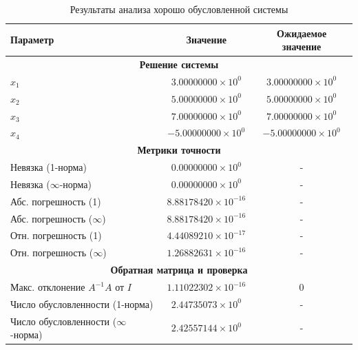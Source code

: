 \documentclass[12pt, a4paper]{article}
\begin{document}
\begin{table}[h]
\centering
\caption{Результаты анализа хорошо обусловленной системы}
\begin{tabular}{|l|c|c|}
\hline
\textbf{Параметр} & \textbf{Значение} & \textbf{Ожидаемое значение} \\
\hline
\multicolumn{3}{|c|}{\textbf{Решение системы}} \\
\hline
$x_1$ & $3.00000000 \times 10^0$ & $3.00000000 \times 10^0$ \\
$x_2$ & $5.00000000 \times 10^0$ & $5.00000000 \times 10^0$ \\
$x_3$ & $7.00000000 \times 10^0$ & $7.00000000 \times 10^0$ \\
$x_4$ & $-5.00000000 \times 10^0$ & $-5.00000000 \times 10^0$ \\
\hline
\multicolumn{3}{|c|}{\textbf{Метрики точности}} \\
\hline
Невязка (1-норма) & $0.00000000 \times 10^0$ & - \\
Невязка ($\infty$-норма) & $0.00000000 \times 10^0$ & - \\
Абс. погрешность (1) & $8.88178420 \times 10^{-16}$ & - \\
Абс. погрешность ($\infty$) & $8.88178420 \times 10^{-16}$ & - \\
Отн. погрешность (1) & $4.44089210 \times 10^{-17}$ & - \\
Отн. погрешность ($\infty$) & $1.26882631 \times 10^{-16}$ & - \\
\hline
\multicolumn{3}{|c|}{\textbf{Обратная матрица и проверка}} \\
\hline
Макс. отклонение $A^{-1}A$ от $I$ & $1.11022302 \times 10^{-16}$ & 0 \\
Число обусловленности (1-норма) & $2.44735073 \times 10^0$ & - \\
Число обусловленности ($\infty$-норма) & $2.42557144 \times 10^0$ & - \\
\hline
\end{tabular}
\end{table}
\end{document}
